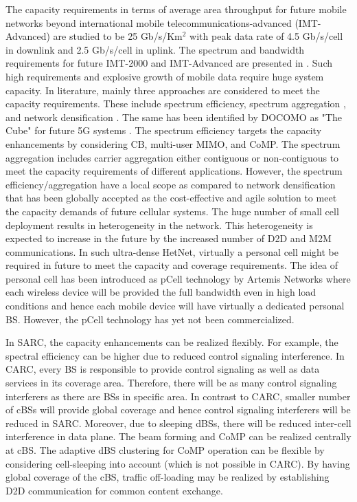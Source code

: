 \documentclass[article,10pt,twocolumn]{IEEEtran}
\begin{document}
The capacity requirements in terms of average area throughput for future mobile networks beyond international mobile telecommunications-advanced (IMT-Advanced) are studied to be 25 Gb/s/Km$^2$ \citep{5706319} with peak data rate of 4.5 Gb/s/cell in downlink and 2.5 Gb/s/cell in uplink. The spectrum and bandwidth requirements for future IMT-2000 and IMT-Advanced are presented in \citep{IMT}. Such high requirements and explosive growth of mobile data require huge system capacity. In literature, mainly three approaches are considered to meet the capacity requirements. These include spectrum efficiency, spectrum aggregation \citep{6881734}, and network densification \citep{6477646}. The same has been identified by DOCOMO as "The Cube" for future 5G systems \citep{DOCOMO}. The spectrum efficiency targets the capacity enhancements by considering CB, multi-user MIMO, and CoMP. The spectrum aggregation includes carrier aggregation either contiguous or non-contiguous to meet the capacity requirements of different applications. However, the spectrum efficiency/aggregation have a local scope as compared to network densification that has been globally accepted as the cost-effective and agile solution to meet the capacity demands of future cellular systems. The huge number of small cell deployment results in heterogeneity in the network. This heterogeneity is expected to increase in the future by the increased number of D2D and M2M communications. In such ultra-dense HetNet, virtually a personal cell might be required in future to meet the capacity and coverage requirements. The idea of personal cell has been introduced as pCell technology by Artemis Networks \citep{Artemis} where each wireless device will be provided the full bandwidth even in high load conditions and hence each mobile device will have virtually a dedicated personal BS. However, the pCell technology has yet not been commercialized.

In SARC, the capacity enhancements can be realized flexibly. For example, the spectral efficiency can be higher due to reduced control signaling interference. In CARC, every BS is responsible to provide control signaling as well as data services in its coverage area. Therefore, there will be as many control signaling interferers as there are BSs in specific area. In contrast to CARC, smaller number of cBSs will provide global coverage and hence control signaling interferers will be reduced in SARC. Moreover, due to sleeping dBSs, there will be reduced inter-cell interference in data plane. The beam forming and CoMP can be realized centrally at cBS. The adaptive dBS clustering for CoMP operation can be flexible by considering cell-sleeping into account (which is not possible in CARC). By having global coverage of the cBS, traffic off-loading may be realized by establishing D2D communication for common content exchange. 
\end{document}

